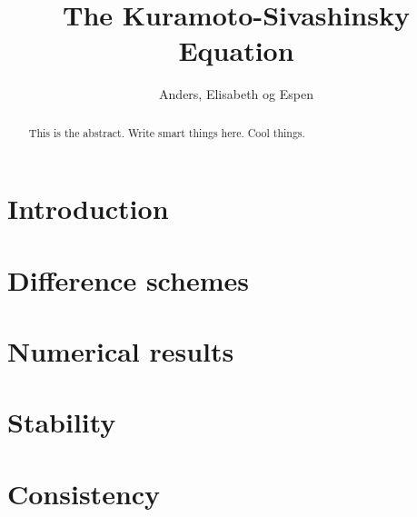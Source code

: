 \documentclass[10pt,a4paper]{article}
\begin{document}
\title{The Kuramoto-Sivashinsky Equation}
\author{Anders, Elisabeth og Espen}
\maketitle

\begin{abstract}
This is the abstract. Write smart things here. Cool things.
\end{abstract}



\section{Introduction}


\section{Difference schemes}


\section{Numerical results}


\section{Stability}


\section{Consistency}

\end{document}
